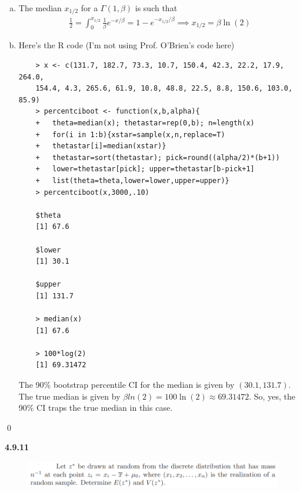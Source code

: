 \documentclass{book}
\theoremstyle{definition}
\newcommand{\f}[2]{\frac{#1}{#2}}
\begin{document}
\begin{enumerate}[(a)]
	\item The median $x_{1/2}$ for a $\Gamma(1,\beta)$ is such that
	\begin{align}
	\f{1}{2} = \int^{x_{1/2}}_0 \f{1}{\beta} e^{-x/\beta} = 1 - e^{-x_{1/2}/\beta} \implies \boxed{x_{1/2} = \beta \ln(2)}
	\end{align}
	
	
	\item Here's the R code (I'm not using Prof. O'Brien's code here)
	\begin{lstlisting}
	> x <- c(131.7, 182.7, 73.3, 10.7, 150.4, 42.3, 22.2, 17.9, 264.0,
	154.4, 4.3, 265.6, 61.9, 10.8, 48.8, 22.5, 8.8, 150.6, 103.0, 85.9)
	> percentciboot <- function(x,b,alpha){
	+   theta=median(x); thetastar=rep(0,b); n=length(x)
	+   for(i in 1:b){xstar=sample(x,n,replace=T)
	+   thetastar[i]=median(xstar)}
	+   thetastar=sort(thetastar); pick=round((alpha/2)*(b+1))
	+   lower=thetastar[pick]; upper=thetastar[b-pick+1]
	+   list(theta=theta,lower=lower,upper=upper)}
	> percentciboot(x,3000,.10)
	
	$theta
	[1] 67.6
	
	$lower
	[1] 30.1
	
	$upper
	[1] 131.7
	
	> median(x)
	[1] 67.6
	
	> 100*log(2)
	[1] 69.31472
	\end{lstlisting}
	The 90\% bootstrap percentile CI for the median is given by $(30.1, 131.7)$. The true median is given by $\beta ln(2) = 100 \ln(2)  \approx 69.31472$. So, yes, the 90\% CI traps the true median in this case.
	
	
	
\end{enumerate}\qed






















\newpage
\noindent\textbf{4.9.11}


\begin{figure}[!htb]
	\centering
	\includegraphics[scale=0.5]{4911}
\end{figure}
\end{document}
